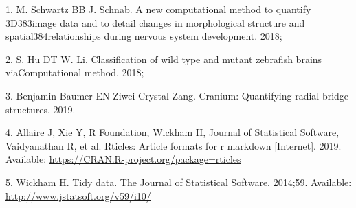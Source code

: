 \documentclass[10pt,letterpaper]{article}
\begin{document}
\hypertarget{refs}{}
\leavevmode\hypertarget{ref-Schwartz18}{}%
1. M. Schwartz BB J. Schnab. A new computational method to quantify
3D383image data and to detail changes in morphological structure and
spatial384relationships during nervous system development. 2018;

\leavevmode\hypertarget{ref-Hu18}{}%
2. S. Hu DT W. Li. Classification of wild type and mutant zebrafish
brains viaComputational method. 2018;

\leavevmode\hypertarget{ref-cranium}{}%
3. Benjamin Baumer EN Ziwei Crystal Zang. Cranium: Quantifying radial
bridge structures. 2019.

\leavevmode\hypertarget{ref-rticles19}{}%
4. Allaire J, Xie Y, R Foundation, Wickham H, Journal of Statistical
Software, Vaidyanathan R, et al. Rticles: Article formats for r markdown
{[}Internet{]}. 2019. Available:
\url{https://CRAN.R-project.org/package=rticles}

\leavevmode\hypertarget{ref-tidy-data}{}%
5. Wickham H. Tidy data. The Journal of Statistical Software. 2014;59.
Available: \url{http://www.jstatsoft.org/v59/i10/}

\nolinenumbers
\end{document}
